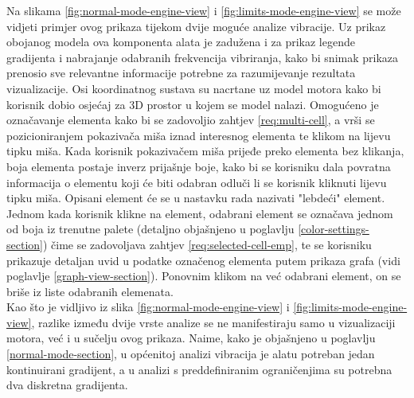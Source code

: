 \documentclass[times, utf8, diplomski]{fer}
\begin{document}
Na slikama \ref{fig:normal-mode-engine-view} i \ref{fig:limits-mode-engine-view} se može vidjeti primjer ovog prikaza tijekom dvije moguće analize vibracije. Uz prikaz obojanog modela ova komponenta alata je zadužena i za prikaz legende gradijenta i nabrajanje odabranih frekvencija vibriranja, kako bi snimak prikaza prenosio sve relevantne informacije potrebne za razumijevanje rezultata vizualizacije. Osi koordinatnog sustava su nacrtane uz model motora kako bi korisnik dobio osjećaj za 3D prostor u kojem se model nalazi. Omogućeno je označavanje elementa kako bi se zadovoljio zahtjev \ref{req:multi-cell}, a vrši se pozicioniranjem pokazivača miša iznad interesnog elementa te klikom na lijevu tipku miša. Kada korisnik pokazivačem miša prijeđe preko elementa bez klikanja, boja elementa postaje inverz prijašnje boje, kako bi se korisniku dala povratna informacija o elementu koji će biti odabran odluči li se korisnik kliknuti lijevu tipku miša. Opisani element će se u nastavku rada nazivati "lebdeći" element. Jednom kada korisnik klikne na element, odabrani element se označava jednom od boja iz trenutne palete (detaljno objašnjeno u poglavlju \ref{color-settings-section}) čime se zadovoljava zahtjev \ref{req:selected-cell-emp}, te se korisniku prikazuje detaljan uvid u podatke označenog elementa putem prikaza grafa (vidi poglavlje \ref{graph-view-section}). Ponovnim klikom na već odabrani element, on se briše iz liste odabranih elemenata.\\

Kao što je vidljivo iz slika \ref{fig:normal-mode-engine-view} i \ref{fig:limits-mode-engine-view}, razlike između dvije vrste analize se ne manifestiraju samo u vizualizaciji motora, već i u sučelju ovog prikaza. Naime, kako je objašnjeno u poglavlju \ref{normal-mode-section}, u općenitoj analizi vibracija je alatu potreban jedan kontinuirani gradijent, a u analizi s preddefiniranim ograničenjima su potrebna dva diskretna gradijenta.
\end{document}
